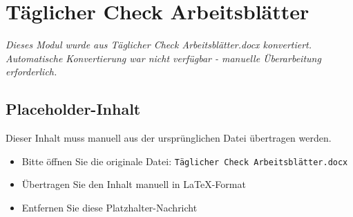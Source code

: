 
\section{Täglicher Check Arbeitsblätter}
\label{sec:täglicher-check-arbeitsblätter}

\begin{center}
\textit{Dieses Modul wurde aus Täglicher Check Arbeitsblätter.docx konvertiert.\\
Automatische Konvertierung war nicht verfügbar - manuelle Überarbeitung erforderlich.}
\end{center}


\subsection{Placeholder-Inhalt}

Dieser Inhalt muss manuell aus der ursprünglichen Datei übertragen werden.

\begin{itemize}
\item Bitte öffnen Sie die originale Datei: \texttt{Täglicher Check Arbeitsblätter.docx}
\item Übertragen Sie den Inhalt manuell in LaTeX-Format
\item Entfernen Sie diese Platzhalter-Nachricht
\end{itemize}
